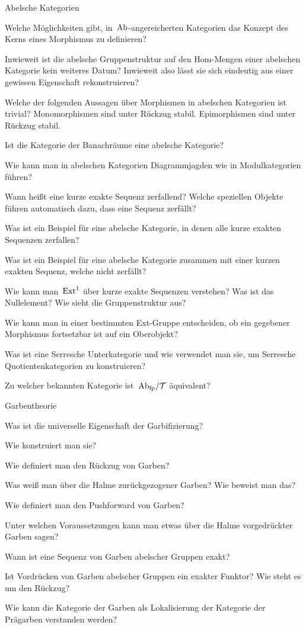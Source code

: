 \documentclass{uebblatt}
\begin{document}
\begin{aufgabeE}{Abelsche Kategorien}
\item Welche Möglichkeiten gibt, in~$\mathrm{Ab}$-angereicherten Kategorien das Konzept
des Kerns eines Morphismus zu definieren?
\item Inwieweit ist die abelsche Gruppenstruktur auf den Hom-Mengen einer
abelschen Kategorie kein weiteres Datum? Inwieweit also lässt sie sich
eindeutig aus einer gewissen Eigenschaft rekonstruieren?
\item Welche der folgenden Aussagen über Morphismen in abelschen Kategorien ist
trivial? Monomorphismen sind unter Rückzug stabil. Epimorphismen sind unter
Rückzug stabil.
\item Ist die Kategorie der Banachräume eine abelsche Kategorie?
\item Wie kann man in abelschen Kategorien Diagrammjagden wie in
Modulkategorien führen?
\item Wann heißt eine kurze exakte Sequenz zerfallend? Welche speziellen
Objekte führen automatisch dazu, dass eine Sequenz zerfällt?
\item Was ist ein Beispiel für eine abelsche Kategorie, in denen alle kurze
exakten Sequenzen zerfallen?
\item Was ist ein Beispiel für eine abelsche Kategorie zusammen mit einer
kurzen exakten Sequenz, welche nicht zerfällt?
\item Wie kann man~$\mathrm{Ext}^1$ über kurze exakte Sequenzen verstehen? Was ist das
Nullelement? Wie sieht die Gruppenstruktur aus?
\item Wie kann man in einer bestimmten Ext-Gruppe entscheiden, ob ein gegebener
Morphismus fortsetzbar ist auf ein Oberobjekt?
\item Was ist eine Serresche Unterkategorie und wie verwendet man sie, um
Serresche Quotientenkategorien zu konstruieren?
\item Zu welcher bekannten Kategorie ist~$\mathrm{Ab}_\text{fp}/\mathcal{T}$ äquivalent?
\end{aufgabeE}

\begin{aufgabeE}{Garbentheorie}
\item Was ist die universelle Eigenschaft der Garbifizierung?
\item Wie konstruiert man sie?
\item Wie definiert man den Rückzug von Garben?
\item Was weiß man über die Halme zurückgezogener Garben? Wie beweist man das?
\item Wie definiert man den Pushforward von Garben?
\item Unter welchen Voraussetzungen kann man etwas über die Halme vorgedrückter
Garben sagen?
\item Wann ist eine Sequenz von Garben abelscher Gruppen exakt?
\item Ist Vordrücken von Garben abelscher Gruppen ein exakter Funktor? Wie
steht es um den Rückzug?
\item Wie kann die Kategorie der Garben als Lokalisierung der Kategorie der
Prägarben verstanden werden?
\end{aufgabeE}
\end{document}
